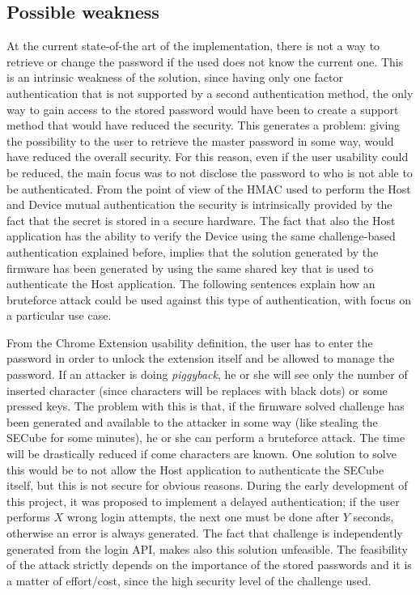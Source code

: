 \subsection{Possible weakness}
\label{sec:weakness}
At the current state-of-the art of the implementation, there is not a way to retrieve or change the password if the used does not know the current one. This is an intrinsic weakness of the solution, since having only one factor authentication that is not supported by a second authentication method, the only way to gain access to the stored password would have been to create a support method that would have reduced the security. This generates a problem: giving the possibility to the user to retrieve the master password in some way, would have reduced the overall security. For this reason, even if the user usability could be reduced, the main focus was to not disclose the password to who is not able to be authenticated.\newline\newline
From the point of view of the HMAC used to perform the Host and Device mutual authentication the security is intrinsically provided by the fact that the secret is stored in a secure hardware. The fact that also the Host application has the ability to verify the Device using the same challenge-based authentication explained before, implies that the solution generated by the firmware has been generated by using the same shared key that is used to authenticate the Host application. The following sentences explain how an bruteforce attack could be used against this type of authentication, with focus on a particular use case.

From the Chrome Extension usability definition, the user has to enter the password in order to unlock the extension itself and be allowed to manage the password. If an attacker is doing \textit{piggyback}, he or she will see only the number of inserted character (since characters will be replaces with black dots) or some pressed keys. The problem with this is that, if the firmware solved challenge has been generated and available to the attacker in some way (like stealing the SECube for some minutes), he or she can perform a bruteforce attack. The time will be drastically reduced if come characters are known. One solution to solve this would be to not allow the Host application to authenticate the SECube itself, but this is not secure for obvious reasons. 
During the early development of this project, it was proposed to implement a delayed authentication; if the user performs $X$ wrong login attempts, the next one must be done after $Y$ seconds, otherwise an error is always generated. The fact that challenge is independently generated from the login API, makes also this solution unfeasible. The feasibility of the attack strictly depends on the importance of the stored passwords and it is a matter of effort/cost, since the high security level of the challenge used.



